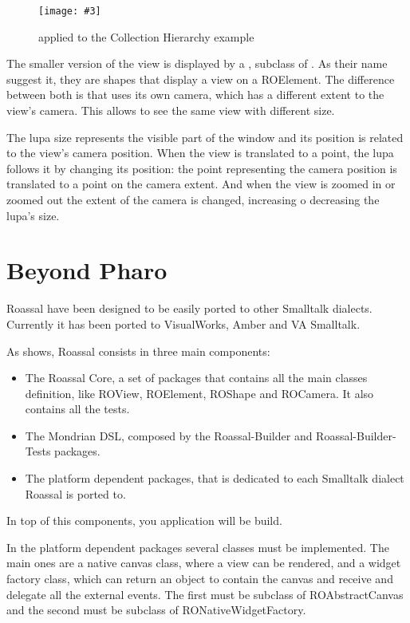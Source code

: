 \documentclass[a4paper,10pt,twoside]{book}
\newcommand{\fig}[4]{
		\begin{figure}[#1]
			\centering
			\texttt{[image: \#3]}
			\caption{\label{fig:#3}#4}
		\end{figure}}
\begin{document}
\fig{H}{0.9}{miniMap}{ applied to the Collection Hierarchy example}

The smaller version of the view is displayed by a , subclass of . 
As their name suggest it, they are shapes that display a view on a ROElement. The difference between both is that  uses its own camera, which has a different extent to the view's camera. This allows  to see the same view with different size. 

The lupa  size represents the visible part of the window and its position is related to the view's camera position. When the view is translated to a point, the lupa follows it by changing its position: the point representing the camera position is translated to a point on the  camera extent. And when the view is zoomed in or zoomed out the extent of the camera is changed, increasing o decreasing the lupa's size.




\section{Beyond Pharo}

Roassal have been designed to be easily ported to other Smalltalk dialects. Currently it has been ported to VisualWorks, Amber and VA Smalltalk.

As  shows, Roassal consists in three main components:

\begin{itemize}
\item  The Roassal Core, a set of packages that contains all the main classes definition, like ROView, ROElement, ROShape and ROCamera. It also contains all the tests.
\item The Mondrian DSL, composed by the Roassal-Builder and Roassal-Builder-Tests packages.
\item The platform dependent packages, that is dedicated to each Smalltalk dialect Roassal is ported to.
\end{itemize} 

In top of this components, you application will be build.

In the platform dependent packages several classes must be implemented. The main ones are a native canvas class, where a view can be rendered, and a widget factory class, which can return an object to contain the canvas and receive and delegate all the external events.
The first must be subclass of ROAbstractCanvas and the second must be subclass of RONativeWidgetFactory.
\end{document}
